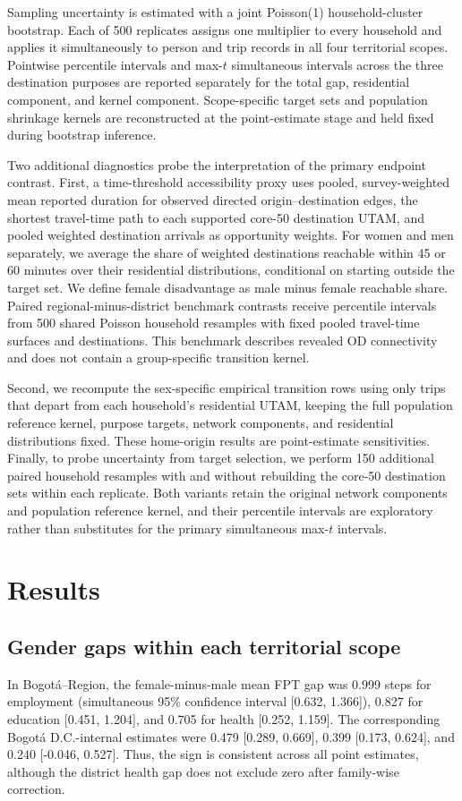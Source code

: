 \documentclass[11pt]{article}
\begin{document}
Sampling uncertainty is estimated with a joint Poisson(1) household-cluster bootstrap. Each of 500 replicates assigns one multiplier to every household and applies it simultaneously to person and trip records in all four territorial scopes. Pointwise percentile intervals and max-$t$ simultaneous intervals across the three destination purposes are reported separately for the total gap, residential component, and kernel component. Scope-specific target sets and population shrinkage kernels are reconstructed at the point-estimate stage and held fixed during bootstrap inference.

Two additional diagnostics probe the interpretation of the primary endpoint contrast. First, a time-threshold accessibility proxy uses pooled, survey-weighted mean reported duration for observed directed origin--destination edges, the shortest travel-time path to each supported core-50 destination UTAM, and pooled weighted destination arrivals as opportunity weights. For women and men separately, we average the share of weighted destinations reachable within 45 or 60 minutes over their residential distributions, conditional on starting outside the target set. We define female disadvantage as male minus female reachable share. Paired regional-minus-district benchmark contrasts receive percentile intervals from 500 shared Poisson household resamples with fixed pooled travel-time surfaces and destinations. This benchmark describes revealed OD connectivity and does not contain a group-specific transition kernel.

Second, we recompute the sex-specific empirical transition rows using only trips that depart from each household's residential UTAM, keeping the full population reference kernel, purpose targets, network components, and residential distributions fixed. These home-origin results are point-estimate sensitivities. Finally, to probe uncertainty from target selection, we perform 150 additional paired household resamples with and without rebuilding the core-50 destination sets within each replicate. Both variants retain the original network components and population reference kernel, and their percentile intervals are exploratory rather than substitutes for the primary simultaneous max-$t$ intervals.

\section{Results}
\subsection{Gender gaps within each territorial scope}
In Bogotá--Region, the female-minus-male mean FPT gap was 0.999 steps for employment (simultaneous 95\% confidence interval [0.632, 1.366]), 0.827 for education [0.451, 1.204], and 0.705 for health [0.252, 1.159]. The corresponding Bogotá D.C.-internal estimates were 0.479 [0.289, 0.669], 0.399 [0.173, 0.624], and 0.240 [-0.046, 0.527]. Thus, the sign is consistent across all point estimates, although the district health gap does not exclude zero after family-wise correction.
\end{document}
